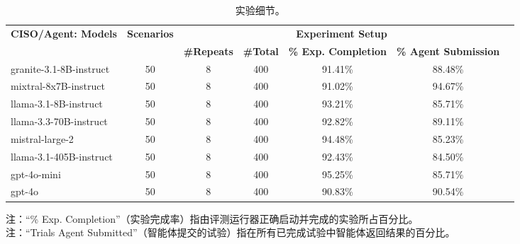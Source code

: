 \documentclass[10pt,UTF8,fontset=fandol]{ctexart}
\begin{document}
\begin{table}[H]
\centering
\caption{实验细节。}
\label{tab:itbench-23}
\begin{adjustbox}{max width=\linewidth}
\begin{tabular}{lcccccc}
\toprule
\multirow{2}{*}{\textbf{CISO/Agent: Models}} & \multirow{2}{*}{\textbf{Scenarios}} & \multicolumn{4}{c}{\textbf{Experiment Setup}} \\
\cmidrule(lr){3-6}
 & & \textbf{\#Repeats} & \textbf{\#Total} & \textbf{\% Exp. Completion} & \textbf{\% Agent Submission} \\
\midrule
granite-3.1-8B-instruct  & 50 & 8 & 400 & 91.41\% & 88.48\% \\
mixtral-8x7B-instruct    & 50 & 8 & 400 & 91.02\% & 94.67\% \\
llama-3.1-8B-instruct    & 50 & 8 & 400 & 93.21\% & 85.71\% \\
llama-3.3-70B-instruct   & 50 & 8 & 400 & 92.82\% & 89.11\% \\
mistral-large-2          & 50 & 8 & 400 & 94.48\% & 85.23\% \\
llama-3.1-405B-instruct  & 50 & 8 & 400 & 92.43\% & 84.50\% \\
gpt-4o-mini              & 50 & 8 & 400 & 95.25\% & 85.71\% \\
gpt-4o                   & 50 & 8 & 400 & 90.83\% & 90.54\% \\
\bottomrule
\end{tabular}
\end{adjustbox}
\par\smallskip
\footnotesize\raggedright
注：``\% Exp. Completion''（实验完成率）指由评测运行器正确启动并完成的实验所占百分比。\\
注：``Trials Agent Submitted''（智能体提交的试验）指在所有已完成试验中智能体返回结果的百分比。
\end{table}
\end{document}
